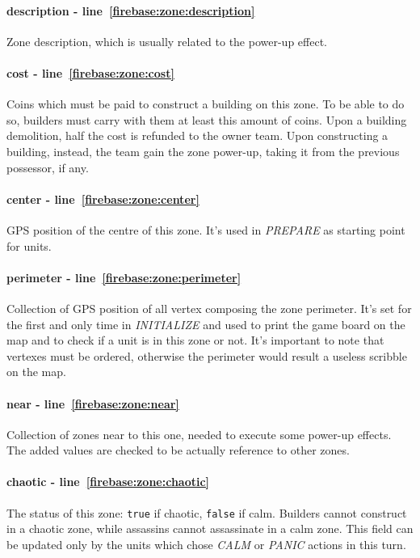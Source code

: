 				\paragraph{description - line~\ref{firebase:zone:description}}
				Zone description, which is usually related to the power-up effect.
				
				\paragraph{cost - line~\ref{firebase:zone:cost}}
				Coins which must be paid to construct a building on this zone. To be able to do so, builders must carry with them at least this amount of coins. Upon a building demolition, half the cost is refunded to the owner team. Upon constructing a building, instead, the team gain the zone power-up, taking it from the previous possessor, if any.
				
				\paragraph{center - line~\ref{firebase:zone:center}}
				GPS position of the centre of this zone. It's used in \emph{PREPARE} as starting point for units.
				
				\paragraph{perimeter - line~\ref{firebase:zone:perimeter}}
				Collection of GPS position of all vertex composing the zone perimeter. It's set for the first and only time in \emph{INITIALIZE} and used to print the game board on the map and to check if a unit is in this zone or not. It's important to note that vertexes must be ordered, otherwise the perimeter would result a useless scribble on the map.
				
				\paragraph{near - line~\ref{firebase:zone:near}}
				Collection of zones near to this one, needed to execute some power-up effects.
				The added values are checked to be actually reference to other zones.
				
				\paragraph{chaotic - line~\ref{firebase:zone:chaotic}}
				The status of this zone: \lstinline|true| if chaotic, \lstinline|false| if calm. Builders cannot construct in a chaotic zone, while assassins cannot assassinate in a calm zone. This field can be updated only by the units which chose \emph{CALM} or \emph{PANIC} actions in this turn.
				
